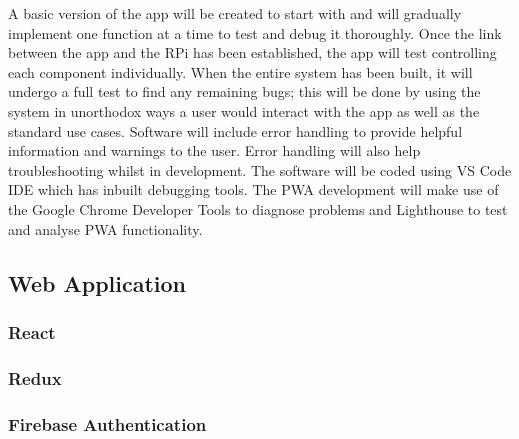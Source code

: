 \documentclass[final]{cmpreport}
\begin{document}
    A basic version of the app will be created to start with and will gradually implement one function at a time to test and debug it thoroughly. Once the link between the app and the RPi has been established, the app will test controlling each component individually. When the entire system has been built, it will undergo a full test to find any remaining bugs; this will be done by using the system in unorthodox ways a user would interact with the app as well as the standard use cases. Software will include error handling to provide helpful information and warnings to the user. Error handling will also help troubleshooting whilst in development. The software will be coded using VS Code IDE which has inbuilt debugging tools. The PWA development will make use of the Google Chrome Developer Tools to diagnose problems and Lighthouse to test and analyse PWA functionality. 
    
    
    
    
    \subsection{Web Application}
    
        \subsubsection{React}
        
        \subsubsection{Redux}
    
        \subsubsection{Firebase Authentication}
        
\end{document}

